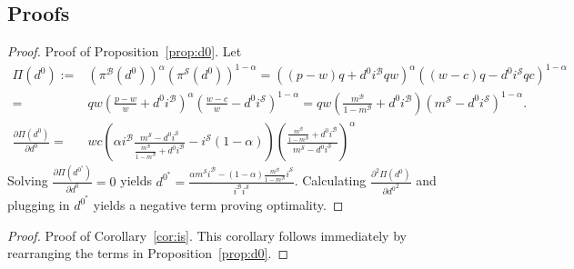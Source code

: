\documentclass[A4,11pt]{article}
\newcommand{\bx}{\mathcal B}
\newcommand{\sx}{\mathcal S}
\newcommand{\MBX}{\frac{m^\bx}{1-m^\bx}}
\newcommand{\DNULL}{\frac{\alpha m^{\sx}i^{\bx}-\left(1-\alpha\right)\frac{m^{\bx}}{1-m^{\bx}}i^{\sx}}{i^{\bx}i^{\sx}}}
\newcommand{\BA}{\alpha}
\newcommand{\SA}{{1-\alpha}}
\renewcommand{\~}[1]{\tilde{#1}}
\renewcommand{\-}[1]{\overline{#1}}
\begin{document}
\begin{appendices}
\FloatBarrier
\section{Proofs}
\begin{proof}
Proof of Proposition~\ref{prop:d0}. Let
\begin{equation}
\begin{split}\nonumber
\Pi\left(d^0\right) := & \left(\pi^{\bx}\left(d^0\right)\right)^\BA\left(\pi^{\sx}\left(d^0\right)\right)^\SA =\left((p-w)q+d^0i^{\bx}qw \right)^\BA\left((w-c)q-d^0i^{\sx}qc\right)^\SA \\
		    = & qw\left(\frac{p-w}{w}+d^0i^{\bx} \right)^\BA\left(\frac{w-c}{w}-d^0i^{\sx} \right)^\SA = qw\left(\MBX+d^0i^{\bx}\right)\left(m^{\sx}-d^0i^{\sx}\right)^\SA.\\
\frac{\partial \Pi\left(d^0\right)}{\partial d^0} = & wc\left(\alpha i^\bx\frac{m^\sx-d^0i^\sx}{\MBX+d^0i^\bx}-i^\sx\left(1-\alpha\right)\right)\left(\frac{\MBX+d^0i^\bx}{m^\sx-d^0 i^\sx}\right)^\alpha
\end{split}
\end{equation}
Solving  $\frac{\partial \Pi\left(d^{0^*}\right)}{\partial d^0} =0$ yields $d^{0^*} = \DNULL$. Calculating $\frac{\partial^2 \Pi\left(d^0\right)}{\partial {d^0}^2}$ and plugging in $d^{0^*}$ yields a negative term proving optimality.
\end{proof}

\begin{proof}{Proof of Corollary~\ref{cor:is}.} This corollary follows immediately by rearranging the terms in Proposition~\ref{prop:d0}.
\end{proof}



\end{appendices}



\end{document}
